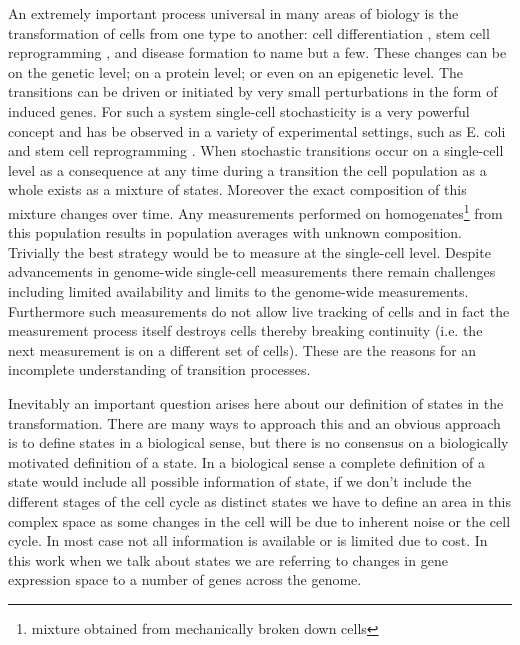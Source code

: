 An extremely important process universal in many areas of biology is the transformation of cells from one type to another: cell differentiation \citep{Tang:2010ed, Vierbuchen:2010fa}, stem cell reprogramming \citep{Takahashi:2006hi, Hanna:2010jy}, and disease formation \citep{Hannah:2000wo, Vogel:2010jb} to name but a few. These changes can be on the genetic level; on a protein level; or even on an epigenetic level. The transitions can be driven or initiated by very small perturbations in the form of induced genes. For such a system single-cell stochasticity is a very powerful concept and has be observed in a variety of experimental settings, such as E. coli  \citep{Elowitz:2002hb} and stem cell reprogramming \citep{Hanna:2009ix}. When stochastic transitions occur on a single-cell level as a consequence at any time during a transition the cell population as a whole exists as a mixture of states. Moreover the exact composition of this mixture changes over time. Any measurements performed on homogenates\footnote{mixture obtained from mechanically broken down cells} from this population results in population averages with unknown composition. Trivially the best strategy would be to measure at the single-cell level. Despite advancements in genome-wide single-cell measurements \citep{deSouza:2012dz, Tang:2011gt} there remain challenges including limited availability and limits to the genome-wide measurements. Furthermore such measurements do not allow live tracking of cells and in fact the measurement process itself destroys cells thereby breaking continuity (i.e. the next measurement is on a different set of cells). These are the reasons for an incomplete understanding of transition processes. 

Inevitably an important question arises here about our definition of states in the transformation. There are many ways to approach this and an obvious approach is to define states in a biological sense, but there is no consensus on a biologically motivated definition of a state. In a biological sense a complete definition of a state would include all possible information of state, if we don't include the different stages of the cell cycle as distinct states we have to define an area in this complex space as some changes in the cell will be due to inherent noise or the cell cycle. In most case not all information is available or is limited due to cost. In this work when we talk about states we are referring to changes in gene expression space to a number of genes across the genome.

